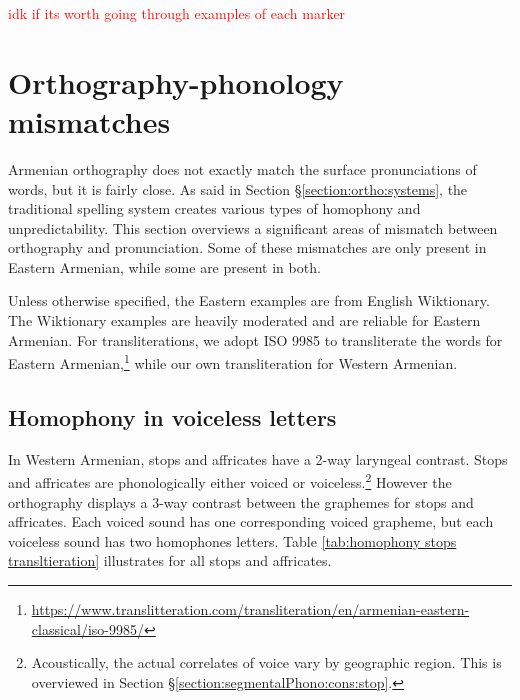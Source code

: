 \textcolor{red}{idk if its worth going through examples of each marker}



\section{Orthography-phonology mismatches}\label{section:ortho:mismatch}

Armenian orthography does not exactly match the surface pronunciations of words, but it is fairly close. As said in Section \S\ref{section:ortho:systems}, the traditional spelling system creates various types of homophony and unpredictability. This section overviews a significant areas of mismatch between orthography and pronunciation. Some of these mismatches are only present in Eastern Armenian, while some are present in both. 

Unless otherwise specified, the Eastern examples are from English Wiktionary. The Wiktionary examples   are heavily moderated and are reliable for Eastern Armenian. For transliterations,  we adopt ISO 9985 to transliterate the words for Eastern Armenian,\footnote{\url{https://www.translitteration.com/transliteration/en/armenian-eastern-classical/iso-9985/}} while our own transliteration for Western Armenian.
\subsection{Homophony in voiceless letters}\label{section:ortho:mismatch:homophony}

In Western Armenian, stops and affricates have a 2-way laryngeal contrast. Stops and affricates are phonologically either voiced or voiceless.\footnote{Acoustically, the actual correlates of voice vary by geographic region. This is overviewed in Section \S\ref{section:segmentalPhono:cons:stop}. } However the orthography displays a 3-way contrast between the graphemes for stops and affricates. Each voiced sound has one corresponding voiced grapheme, but each voiceless sound   has   two homophones letters. Table \ref{tab:homophony stops transltieration} illustrates for all stops and affricates.  


